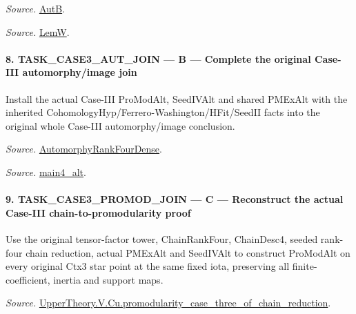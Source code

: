 \documentclass[11pt,a4paper]{article}
\numberwithin{equation}{section}
\theoremstyle{remark}\newtheorem{remark}[theorem]{Remark}
\begin{document}
\emph{Source.} \href{https://github.com/CocoSgt/riemann-hypothesis-lean/blob/7cbf7a0c32fca1badf05931879a37c3f8a2b03b4/src/Development/AutomorphicArithmetic/AutomorphicVarieties/AutomorphicCases/AutomorphyUnramifiedCoefficients.lean#L15-L17}{AutB}.

\emph{Source.} \href{https://github.com/CocoSgt/riemann-hypothesis-lean/blob/7cbf7a0c32fca1badf05931879a37c3f8a2b03b4/src/Development/AutomorphicArithmetic/AutomorphicVarieties/AutomorphicCases/AutomorphyUnramifiedCoefficients.lean#L19-L22}{LemW}.



\paragraph{8. TASK\_\allowbreak CASE3\_\allowbreak AUT\_\allowbreak JOIN — B — Complete the original Case-III automorphy/image join}

Install the actual Case-III ProModAlt, SeedIVAlt and shared PMExAlt with the inherited CohomologyHyp/Ferrero-Washington/HFit/SeedII facts into the original whole Case-III automorphy/image conclusion.

\emph{Source.} \href{https://github.com/CocoSgt/riemann-hypothesis-lean/blob/7cbf7a0c32fca1badf05931879a37c3f8a2b03b4/src/Development/AutomorphicArithmetic/AutomorphicVarieties/ModularityArgument/ThresholdArguments/DenseThresholdCases/PromodularityCaseThree.lean#L43-L44}{AutomorphyRankFourDense}.

\emph{Source.} \href{https://github.com/CocoSgt/riemann-hypothesis-lean/blob/7cbf7a0c32fca1badf05931879a37c3f8a2b03b4/src/Development/AutomorphicArithmetic/AutomorphicVarieties/ModularityArgument/ThresholdArguments/DenseThresholdCases/CuFinal.lean#L44-L44}{main4\_\allowbreak alt}.



\paragraph{9. TASK\_\allowbreak CASE3\_\allowbreak PROMOD\_\allowbreak JOIN — C — Reconstruct the actual Case-III chain-to-promodularity proof}

Use the original tensor-factor tower, ChainRankFour, ChainDesc4, seeded rank-four chain reduction, actual PMExAlt and SeedIVAlt to construct ProModAlt on every original Ctx3 star point at the same fixed iota, preserving all finite-coefficient, inertia and support maps.

\emph{Source.} \href{https://github.com/CocoSgt/riemann-hypothesis-lean/blob/7cbf7a0c32fca1badf05931879a37c3f8a2b03b4/src/Development/AutomorphicArithmetic/AutomorphicVarieties/ModularityArgument/ThresholdArguments/DenseThresholdCases/PromodularityCaseThreeOfLemmas.lean#L131-L153}{UpperTheory.V.Cu.promodularity\_\allowbreak case\_\allowbreak three\_\allowbreak of\_\allowbreak chain\_\allowbreak reduction}.
\end{document}
